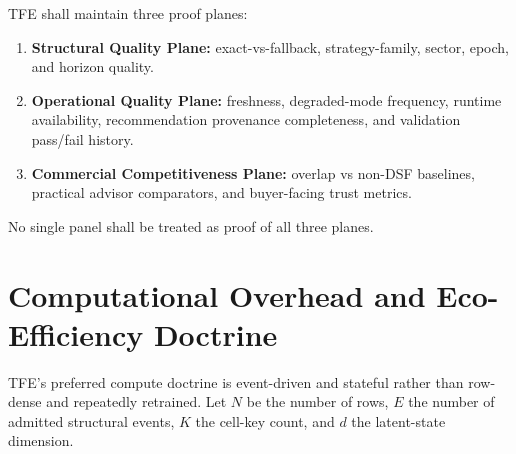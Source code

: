 TFE shall maintain three proof planes:
\begin{enumerate}[leftmargin=1.2cm]
    \item \textbf{Structural Quality Plane:} exact-vs-fallback, strategy-family, sector, epoch, and horizon quality.
    \item \textbf{Operational Quality Plane:} freshness, degraded-mode frequency, runtime availability, recommendation provenance completeness, and validation pass/fail history.
    \item \textbf{Commercial Competitiveness Plane:} overlap vs non-DSF baselines, practical advisor comparators, and buyer-facing trust metrics.
\end{enumerate}
No single panel shall be treated as proof of all three planes.

\section{Computational Overhead and Eco-Efficiency Doctrine}

TFE's preferred compute doctrine is event-driven and stateful rather than row-dense and repeatedly retrained. Let $N$ be the number of rows, $E$ the number of admitted structural events, $K$ the cell-key count, and $d$ the latent-state dimension.


